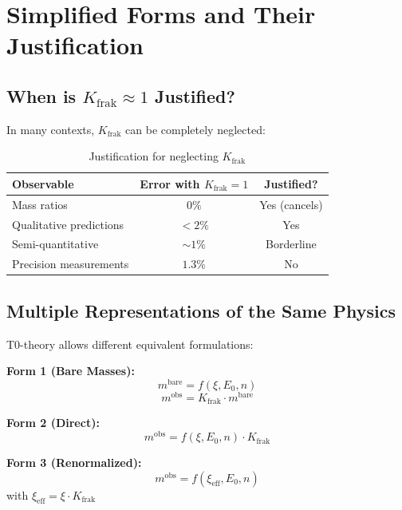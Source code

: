 	\section{Simplified Forms and Their Justification}
	
	\subsection{When is $K_{\text{frak}} \approx 1$ Justified?}
	
	In many contexts, $K_{\text{frak}}$ can be completely neglected:
	
	\begin{table}[h]
		\centering
		\begin{tabular}{lcc}
			\toprule
			\textbf{Observable} & \textbf{Error with $K_{\text{frak}} = 1$} & \textbf{Justified?} \\
			\midrule
			Mass ratios & $0\%$ & Yes (cancels) \\
			Qualitative predictions & $< 2\%$ & Yes \\
			Semi-quantitative & $\sim 1\%$ & Borderline \\
			Precision measurements & $1.3\%$ & No \\
			\bottomrule
		\end{tabular}
		\caption{Justification for neglecting $K_{\text{frak}}$}
	\end{table}
	
	\subsection{Multiple Representations of the Same Physics}
	
	T0-theory allows different equivalent formulations:
	
	\textbf{Form 1 (Bare Masses):}
	\begin{equation}
		m^{\text{bare}} = f(\xi, E_0, n)
	\end{equation}
	\begin{equation}
		m^{\text{obs}} = K_{\text{frak}} \cdot m^{\text{bare}}
	\end{equation}
	
	\textbf{Form 2 (Direct):}
	\begin{equation}
		m^{\text{obs}} = f(\xi, E_0, n) \cdot K_{\text{frak}}
	\end{equation}
	
	\textbf{Form 3 (Renormalized):}
	\begin{equation}
		m^{\text{obs}} = f(\xi_{\text{eff}}, E_0, n)
	\end{equation}
	with $\xi_{\text{eff}} = \xi \cdot K_{\text{frak}}$
	
